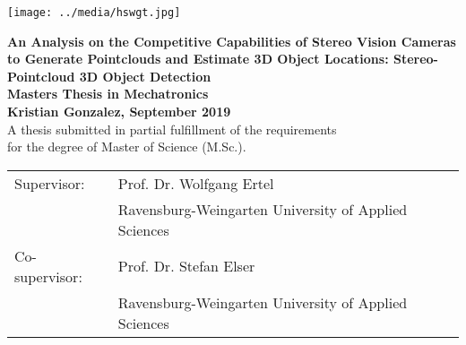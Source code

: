 \pagestyle{empty}
\begin{flushright}
\texttt{[image: ../media/hswgt.jpg]}
\end{flushright}

\begin{center}
\vspace*{2cm}

\LARGE
\textbf{An Analysis on the Competitive Capabilities of Stereo Vision Cameras to Generate Pointclouds and Estimate 3D Object Locations: Stereo-Pointcloud 3D Object Detection}\\
\Large
\vspace*{2cm}
\noindent \textbf{Masters Thesis in Mechatronics}\\
\vspace*{0.5cm}
\noindent \textbf{Kristian Gonzalez, September 2019}\\
\vspace*{2cm}
\normalsize
A thesis submitted in partial fulfillment of the requirements\\ for the degree
of Master of Science (M.Sc.).

\end{center}

\vspace*{4.5cm}
\begin{tabular}{ll}
Supervisor: & Prof. Dr. Wolfgang Ertel \\
 & Ravensburg-Weingarten University of Applied Sciences\\
Co-supervisor: & Prof. Dr. Stefan Elser\\
 & Ravensburg-Weingarten University of Applied Sciences\\
\end{tabular}
